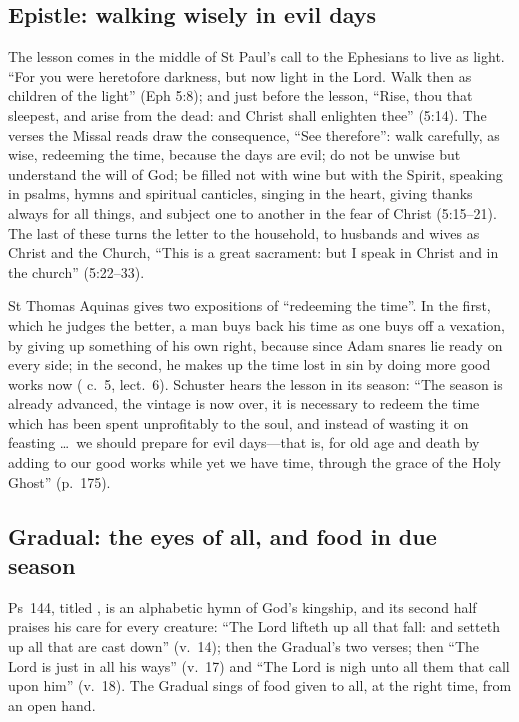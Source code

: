 \subsection{Epistle: walking wisely in evil days}

The lesson comes in the middle of St Paul's call to the Ephesians to live as
light. ``For you were heretofore darkness, but now light in the Lord. Walk then
as children of the light'' (Eph 5:8); and just before the lesson, ``Rise, thou
that sleepest, and arise from the dead: and Christ shall enlighten thee''
(5:14). The verses the Missal reads draw the consequence, ``See therefore'': walk
carefully, as wise, redeeming the time, because the days are evil; do not be
unwise but understand the will of God; be filled not with wine but with the
Spirit, speaking in psalms, hymns and spiritual canticles, singing in the heart,
giving thanks always for all things, and subject one to another in the fear of
Christ (5:15--21). The last of these turns the letter to the household, to
husbands and wives as Christ and the Church, ``This is a great sacrament: but I
speak in Christ and in the church'' (5:22--33).

St Thomas Aquinas gives two expositions of ``redeeming the time''. In the first,
which he judges the better, a man buys back his time as one buys off a vexation,
by giving up something of his own right, because since Adam snares lie ready
on every side; in the second, he makes up the time lost in sin by doing more
good works now ( c.~5, lect.~6). Schuster hears
the lesson in its season: ``The season is already advanced, the vintage is now
over, it is necessary to redeem the time which has been spent unprofitably to
the soul, and instead of wasting it on feasting \dots\ we should prepare for
evil days---that is, for old age and death by adding to our good works while yet
we have time, through the grace of the Holy Ghost'' (p.~175).

\subsection{Gradual: the eyes of all, and food in due season}

Ps~144, titled , is an alphabetic hymn of God's
kingship, and its second half praises his care for every creature: ``The Lord
lifteth up all that fall: and setteth up all that are cast down'' (v.~14); then
the Gradual's two verses; then ``The Lord is just in all his ways'' (v.~17) and
``The Lord is nigh unto all them that call upon him'' (v.~18). The Gradual
sings of food given to all, at the right time, from an open hand.

